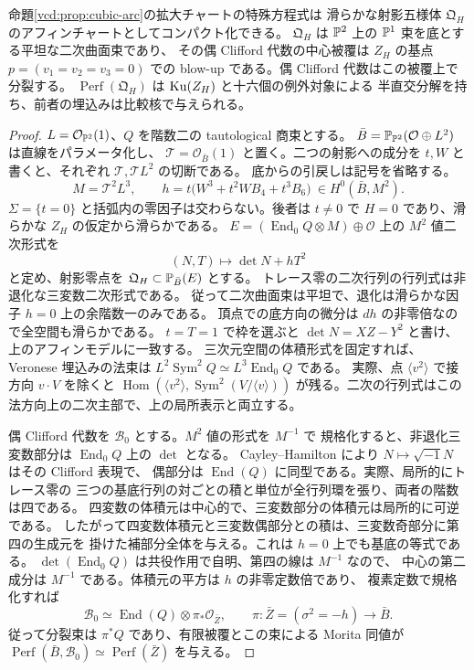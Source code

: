 \begin{theorem}[法方向の二次曲面束とその残余圏]\label{vcd:thm:quadric-component}
命題\ref{vcd:prop:cubic-arc}の拡大チャートの特殊方程式は
滑らかな射影五様体 $\mathfrak Q_H$ のアフィンチャートとしてコンパクト化できる。
$\mathfrak Q_H$ は $\mathbb P^2$ 上の $\mathbb P^1$ 束を底とする平坦な二次曲面束であり、
その偶 Clifford 代数の中心被覆は $Z_H$ の基点 $p=(v_1=v_2=v_3=0)$ での
blow-up である。偶 Clifford 代数はこの被覆上で分裂する。
$\operatorname{Perf}(\mathfrak Q_H)$ は $\operatorname{Ku}(Z_H)$ と十六個の例外対象による
半直交分解を持ち、前者の埋込みは比較核で与えられる。
\end{theorem}
\begin{proof}
$L=\mathcal O_{\mathbb P^2}(1)$、$Q$ を階数二の tautological 商束とする。
$\bar B=\mathbb P_{\mathbb P^2}(\mathcal O\oplus L^2)$ は直線をパラメータ化し、
$\mathcal T=\mathcal O_{\bar B}(1)$ と置く。二つの射影への成分を
$t,W$ と書くと、それぞれ $\mathcal T,\mathcal T L^2$ の切断である。
底からの引戻しは記号を省略する。
\[
 M=\mathcal T^2L^3,\qquad
 h=t\big(W^3+t^2WB_4+t^3B_6\big)\ \in H^0(\bar B,M^2).
\]
$\Sigma=\{t=0\}$ と括弧内の零因子は交わらない。後者は $t\ne0$ で
$H=0$ であり、滑らかな $Z_H$ の仮定から滑らかである。
$E=(\operatorname{End}_0 Q\otimes M)\oplus\mathcal O$ 上の $M^2$ 値二次形式を
\[
                   (N,T)\longmapsto\det N+hT^2
\]
と定め、射影零点を $\mathfrak Q_H\subset\mathbb P_{\bar B}(E)$ とする。
トレース零の二次行列の行列式は非退化な三変数二次形式である。
従って二次曲面束は平坦で、退化は滑らかな因子 $h=0$ 上の余階数一のみである。
頂点での底方向の微分は $dh$ の非零倍なので全空間も滑らかである。
$t=T=1$ で枠を選ぶと $\det N=XZ-Y^2$ と書け、上のアフィンモデルに一致する。
三次元空間の体積形式を固定すれば、Veronese 埋込みの法束は
$L^2\operatorname{Sym}^2Q\simeq L^3\operatorname{End}_0 Q$ である。
実際、点 $\langle v^2\rangle$ で接方向 $v\cdot V$ を除くと
$\operatorname{Hom}(\langle v^2\rangle,\operatorname{Sym}^2(V/\langle v\rangle))$
が残る。二次の行列式はこの法方向上の二次主部で、上の局所表示と両立する。

偶 Clifford 代数を $\mathcal B_0$ とする。$M^2$ 値の形式を $M^{-1}$ で
規格化すると、非退化三変数部分は $\operatorname{End}_0Q$ 上の $\det$ となる。
Cayley--Hamilton により $N\mapsto\sqrt{-1}N$ はその Clifford 表現で、
偶部分は $\operatorname{End}(Q)$ に同型である。実際、局所的にトレース零の
三つの基底行列の対ごとの積と単位が全行列環を張り、両者の階数は四である。
四変数の体積元は中心的で、三変数部分の体積元は局所的に可逆である。
したがって四変数体積元と三変数偶部分との積は、三変数奇部分に第四の生成元を
掛けた補部分全体を与える。これは $h=0$ 上でも基底の等式である。
$\det(\operatorname{End}_0Q)$ は共役作用で自明、第四の線は $M^{-1}$ なので、
中心の第二成分は $M^{-1}$ である。体積元の平方は $h$ の非零定数倍であり、
複素定数で規格化すれば
\[
 \mathcal B_0\simeq\operatorname{End}(Q)\otimes\pi_*\mathcal O_{\bar Z},
 \qquad \pi:\bar Z=(\sigma^2=-h)\longrightarrow\bar B .
\]
従って分裂束は $\pi^*Q$ であり、有限被覆とこの束による Morita 同値が
$\operatorname{Perf}(\bar B,\mathcal B_0)\simeq\operatorname{Perf}(\bar Z)$ を与える。


\end{proof}
